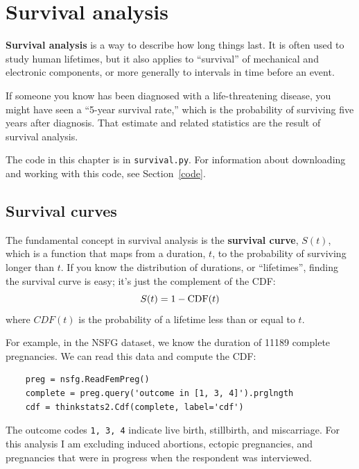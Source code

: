 \documentclass[12pt]{book}
\begin{document}
\chapter{Survival analysis}

{\bf Survival analysis} is a way to describe how long things last.
It is often used to study human lifetimes, but it
also applies to ``survival'' of mechanical and electronic components, or
more generally to intervals in time before an event.

If someone you know has been diagnosed with a life-threatening
disease, you might have seen a ``5-year survival rate,'' which
is the probability of surviving five years after diagnosis.  That
estimate and related statistics are the result of survival analysis.

The code in this chapter is in \verb"survival.py".  For information
about downloading and working with this code, see Section~\ref{code}.


\section{Survival curves}
\label{survival}

The fundamental concept in survival analysis is the {\bf survival
  curve}, $S(t)$, which is a function that maps from a duration, $t$, to the
probability of surviving longer than $t$.  If you know the distribution
of durations, or ``lifetimes'', finding the survival curve is easy;
it's just the complement of the CDF: 
%
\[ S(t) = 1 - \mathrm{CDF}(t) \]
%
where $CDF(t)$ is the probability of a lifetime less than or equal
to $t$.
  

For example, in the NSFG dataset, we know the duration of 11189
complete pregnancies.  We can read this data and compute the CDF:

\begin{verbatim}
    preg = nsfg.ReadFemPreg()
    complete = preg.query('outcome in [1, 3, 4]').prglngth
    cdf = thinkstats2.Cdf(complete, label='cdf')
\end{verbatim}

The outcome codes \verb"1, 3, 4" indicate live birth, stillbirth,
and miscarriage.  For this analysis I am excluding induced abortions,
ectopic pregnancies, and pregnancies that were in progress when
the respondent was interviewed.
\end{document}
